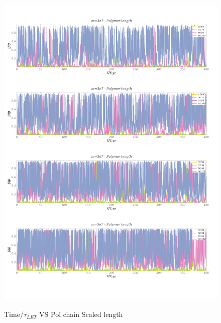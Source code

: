 \documentclass[]{article}
\begin{document}
\begin{figure}
   \centering
       \includegraphics[width=1\textwidth]{timeVSlength.pdf}
   \label{ReNum}
   \caption{Time/$\tau_{LET}$  VS Pol chain Scaled length}
\end{figure}
\end{document}
